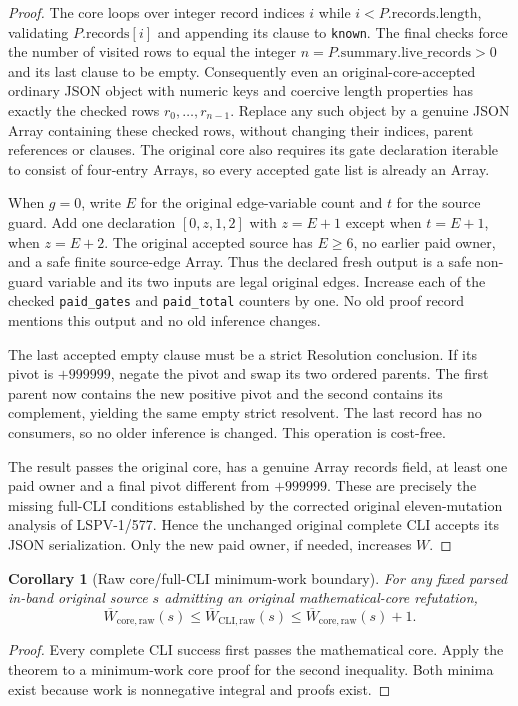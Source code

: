 \documentclass[11pt]{article}
\newtheorem{corollary}{Corollary}
\begin{document}
\begin{proof}
The core loops over integer record indices $i$ while
$i<P.\mathrm{records.length}$, validating $P.\mathrm{records}[i]$ and
appending its clause to \texttt{known}. The final checks force the number
of visited rows to equal the integer
$n=P.\mathrm{summary.live\_records}>0$ and its last clause to be empty.
Consequently even an original-core-accepted ordinary JSON object
with numeric keys and coercive length properties has exactly the
checked rows $r_0,\ldots,r_{n-1}$. Replace any such object by a
genuine JSON Array containing these checked rows, without
changing their indices, parent references or clauses.
The original core also requires its gate declaration iterable
to consist of four-entry Arrays, so every accepted gate list
is already an Array.

When $g=0$, write $E$ for the original edge-variable count
and $t$ for the source guard.
Add one declaration $[0,z,1,2]$ with $z=E+1$ except when
$t=E+1$, when $z=E+2$.
The original accepted source has $E\ge6$, no earlier paid owner,
and a safe finite source-edge Array. Thus the declared fresh
output is a safe non-guard variable and its two inputs are
legal original edges. Increase each of the checked
\texttt{paid\_gates} and \texttt{paid\_total} counters by one.
No old proof record mentions this output and no old inference changes.

The last accepted empty clause must be a strict Resolution
conclusion. If its pivot is $+999999$, negate the pivot and
swap its two ordered parents. The first parent now contains
the new positive pivot and the second contains its complement,
yielding the same empty strict resolvent.
The last record has no consumers, so no older inference is changed.
This operation is cost-free.

The result passes the original core, has a genuine Array
records field, at least one paid owner and a final pivot
different from $+999999$. These are precisely the missing
full-CLI conditions established by the corrected original
eleven-mutation analysis of LSPV-1/577. Hence the unchanged
original complete CLI accepts its JSON serialization.
Only the new paid owner, if needed, increases $W$.
\end{proof}

\begin{corollary}[Raw core/full-CLI minimum-work boundary]
For any fixed parsed in-band original source $s$ admitting
an original mathematical-core refutation,
\[
\overline W_{\mathrm{core,raw}}(s)
\le \overline W_{\mathrm{CLI,raw}}(s)
\le \overline W_{\mathrm{core,raw}}(s)+1.
\]
\end{corollary}
\begin{proof}
Every complete CLI success first passes the mathematical core.
Apply the theorem to a minimum-work core proof for the second inequality.
Both minima exist because work is nonnegative integral and proofs exist.
\end{proof}
\end{document}
